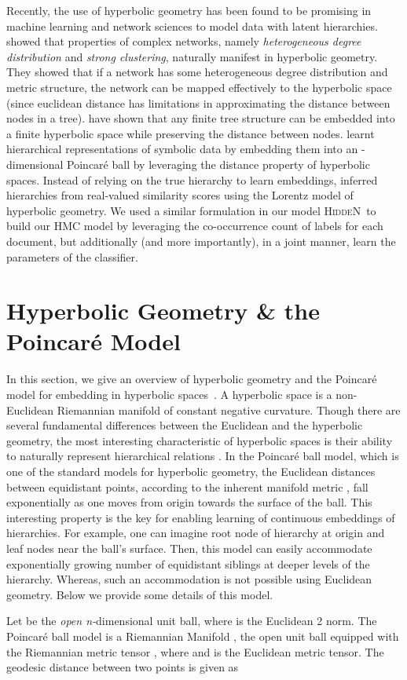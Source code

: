 \documentclass[11pt,a4paper]{article}
\newcommand{\model}{\mbox{\textsc{HiddeN}}}
\begin{document}
Recently, the use of hyperbolic geometry has been found to be promising in machine learning and network sciences to model data with latent hierarchies. \citet{complexhyperbolic} showed that properties of complex networks, namely {\em heterogeneous degree distribution} and {\em strong clustering}, naturally manifest in hyperbolic geometry. They showed that if a network has some heterogeneous degree distribution and metric structure,  the network can be mapped effectively to the hyperbolic space (since euclidean distance has limitations in approximating the distance between nodes in a tree). \citet{hyperbolic1987} have shown that any finite tree structure can be embedded into a finite hyperbolic space while preserving the distance between nodes. \citet{poincare} learnt hierarchical representations of symbolic data by embedding them into an -dimensional Poincar\'e ball by leveraging the distance property of hyperbolic spaces. Instead of relying on the true hierarchy to learn embeddings, \citet{lorentz} inferred hierarchies from real-valued similarity scores using the Lorentz model of hyperbolic geometry. We used a similar formulation in our model \model\ to build our HMC model by leveraging the co-occurrence count of labels for each document, but additionally (and more importantly), in a joint manner, learn the parameters of the classifier.

\section{Hyperbolic Geometry \& the Poincar\'e Model}\label{sec:backpoi}
In this section, we give an overview of hyperbolic geometry and the Poincar\'e model for embedding in hyperbolic spaces~\citep{poincare}.
A hyperbolic space is a non-Euclidean Riemannian manifold of constant negative curvature. Though there are several fundamental differences between the Euclidean and the hyperbolic geometry, the most interesting characteristic of hyperbolic spaces is their ability to naturally represent hierarchical relations \citep{complexhyperbolic}.
In the Poincar\'e ball model, which is one of the standard models for hyperbolic geometry, the Euclidean distances between equidistant points, according to the inherent manifold metric , fall exponentially as one moves from origin towards the surface of the ball. This interesting property is the key for enabling learning of continuous embeddings of hierarchies. For example, one can imagine root node of hierarchy at origin and leaf nodes near the ball's surface. Then, this model can easily accommodate exponentially growing number of equidistant siblings at deeper levels of the hierarchy. Whereas, such an accommodation is not possible using Euclidean geometry. Below we provide some details of this model.\par
Let  be the \textit{open n-}dimensional unit ball, where  is the Euclidean 2 norm. The Poincar\'e ball model is a Riemannian Manifold , the open unit ball equipped with the Riemannian metric tensor , where  and  is the Euclidean metric tensor. The geodesic distance between two points  is given as
\end{document}
